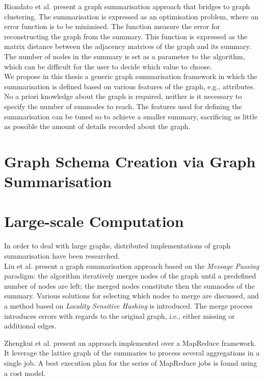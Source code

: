 Riondato et al. \cite{riondato:2014:gsq} present a graph summarisation approach that bridges to graph clustering. The summarisation is expressed as an optimisation problem, where an error function is to be minimised. The function measure the error for reconstructing the graph from the summary. This function is expressed as the matrix distance between the adjacency matrices of the graph and its summary. The number of nodes in the summary is set as a parameter to the algorithm, which can be difficult for the user to decide which value to choose.\\

We propose in this thesis a generic graph summarisation framework in which the summarisation is defined based on various features of the graph, e.g., attributes. No a priori knowledge about the graph is required, neither is it necessary to specify the number of sumnodes to reach. The features used for defining the summarisation can be tuned so to achieve a smaller summary, sacrificing as little as possible the amount of details recorded about the graph.

\section{Graph Schema Creation via Graph Summarisation}

\section{Large-scale Computation}
\label{chap03:review:large-scale-comp}

In order to deal with large graphs, distributed implementations of graph summarisation have been researched.\\

Liu et al. \cite{liu:cikm:2014} present a graph summarisation approach based on the \emph{Message Passing} paradigm: the algorithm iteratively merges nodes of the graph until a predefined number of nodes are left; the merged nodes constitute then the sumnodes of the summary. Various solutions for selecting which nodes to merge are discussed, and a method based on \emph{Locality Sensitive Hashing} is introduced. The merge process introduces errors with regards to the original graph, i.e., either missing or additional edges.

Zhengkui et al. \cite{zhengkui:2014:ppg} present an approach implemented over a MapReduce framework. It leverage the lattice graph of the summaries to process several aggregations in a single job. A best execution plan for the series of MapReduce jobs is found using a cost model.

